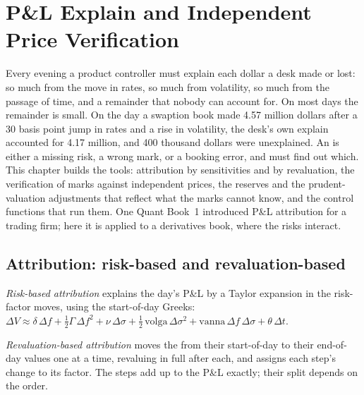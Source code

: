 \chapter{P\&L Explain and Independent Price Verification}\label{ch:rc:pnl-explain-and-independent-price-verification}

Every evening a product controller must explain each dollar a desk made or lost: so much from
the move in rates, so much from volatility, so much from the passage of time, and a remainder
that nobody can account for. On most days the remainder is small. On the day a swaption book
made 4.57 million dollars after a 30 basis point jump in rates and a rise in volatility, the
desk's own explain accounted for 4.17 million, and 400 thousand dollars were unexplained. An
 is either a missing risk, a wrong mark, or a booking error, and 
must find out which. This chapter builds the tools: attribution by sensitivities and by
revaluation, the verification of marks against independent prices, the reserves and the
prudent-valuation adjustments that reflect what the marks cannot know, and the control
functions that run them. One Quant Book~1 introduced P\&L attribution for a trading firm; here it
is applied to a derivatives book, where the risks interact.

\section{Attribution: risk-based and revaluation-based}

\begin{definition}\label{def:rc:pnl-explain-and-independent-price-verification:risk}
\emph{Risk-based attribution} explains the day's P\&L by a Taylor
expansion in the risk-factor moves, using the start-of-day Greeks:
$\Delta V\approx\delta\,\Delta f+\tfrac12\Gamma\,\Delta f^2+\nu\,\Delta\sigma+\tfrac12\,\mathrm{volga}\,\Delta\sigma^2+\mathrm{vanna}\,\Delta f\,\Delta\sigma+\theta\,\Delta t$.
\end{definition}

\begin{definition}\label{def:rc:pnl-explain-and-independent-price-verification:reval}
\emph{Revaluation-based attribution} moves the 
from their start-of-day to their end-of-day values one at a time, revaluing in full after each, and
assigns each step's change to its factor. The steps add up to the P\&L exactly; their split depends
on the order.
\end{definition}

